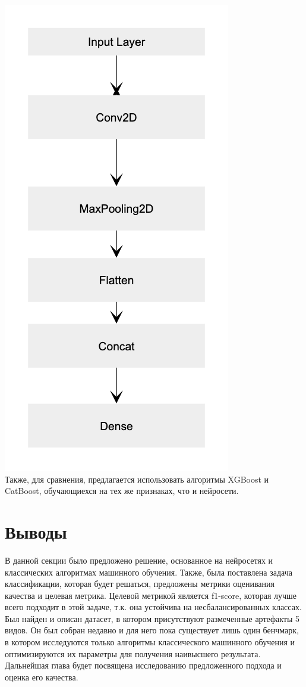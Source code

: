 \documentclass[12pt, a4paper, titlepage]{extreport}
\begin{document}
	\includegraphics[scale=0.6]{layers_cnn.png}
	\\
	Также, для сравнения, предлагается использовать алгоритмы XGBoost и CatBoost, обучающиехся на тех же признаках, что и нейросети. 
	\section*{Выводы}
	В данной секции было предложено решение, основанное на нейросетях и классических алгоритмах машинного обучения. Также, была поставлена задача классификации, которая будет решаться, предложены метрики оценивания качества и целевая метрика. Целевой метрикой является f1-score, которая лучше всего подходит в этой задаче, т.к. она устойчива на несбалансированных классах.\\
	Был найден и описан датасет, в котором присутствуют размеченные артефакты 5 видов. Он был собран недавно и для него пока существует лишь один бенчмарк, в котором исследуются только алгоритмы классического машинного обучения и оптимизируются их параметры для получения наивысшего результата. Дальнейшая глава будет посвящена исследованию предложенного подхода и оценка его качества.
\end{document}
